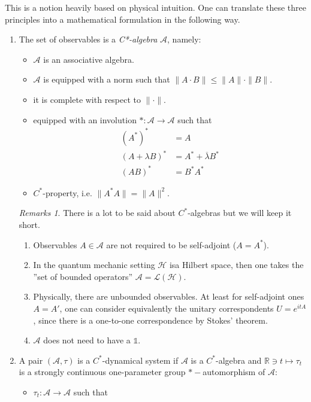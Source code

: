 \documentclass[
a4paper, %
11pt, %
onecolumn, %
openany, %
]{memoir}
\theoremstyle{definition}
\theoremstyle{remark}
\newtheorem{remarks}{Remarks}[chapter]
\theoremstyle{plain}
\begin{document}
This is a notion heavily based on physical intuition. One can translate these three principles into a mathematical formulation in the following way. \begin{enumerate}
	\item The set of observables is a \textit{C*-algebra} $\mathcal{A}$, namely: \begin{itemize}
		\item $\mathcal{A}$ is an associative algebra.
		\item $\mathcal{A}$ is equipped with a norm such that $\|A\cdot B\| \leq \| A \|\cdot \| B\| $.
		\item it is complete with respect to $\| \cdot \|$.
		\item equipped with an involution $*:\mathcal{A}\rightarrow \mathcal{A}$ such that \begin{align}
		(A^*)^*&=A\\
		(A+\lambda B)^* &= A^* +\overline{\lambda}B^*\\
		(AB)^*&=B^*A^*
		\end{align}
		\item $C^*$-property, i.e. $\|A^*A\|=\|A\|^2$.
	\end{itemize}
\begin{remarks}
	There is a lot to be said about $C^*$-algebras but we will keep it short. \begin{enumerate}
		\item Observables $A\in\mathcal{A}$ are not required to be self-adjoint ($A=A^*$).
		\item In the quantum mechanic setting $\mathcal{H}$ isa Hilbert space, then one takes the ''set of bounded operators'' $\mathcal{A}=\mathcal{L}(\mathcal{H})$.
		\item Physically, there are unbounded observables. At least for self-adjoint ones $A=A'$, one can consider equivalently the unitary correspondents $U=e^{itA}$, since there is a one-to-one correspondence by Stokes' theorem.
		\item $\mathcal{A}$ does not need to have a $\mathds{1}$.
	\end{enumerate}
\end{remarks}
\item A pair $(\mathcal{A},\tau)$ is a $C^*$-dynamical system if $\mathcal{A}$ is a $C^*$-algebra and $\mathbb{R}\ni t\mapsto \tau_t$ is a strongly continuous one-parameter group $*-$automorphism of $\mathcal{A}$: \begin{itemize}
	\item $\tau_t:\mathcal{A}\rightarrow \mathcal{A}$ such that \begin{align}

\end{align}
\end{itemize}
\end{enumerate}
\end{document}
